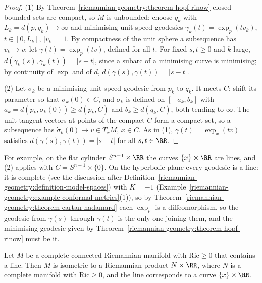 \begin{proof}
(1) By Theorem~\ref{riemannian-geometry:theorem-hopf-rinow} closed bounded sets are compact, so $M$ is unbounded: choose $q_k$ with $L_k = d(p, q_k) \to \infty$ and minimising
unit speed geodesics $\gamma_k(t) = \exp_p(tv_k)$, $t \in [0, L_k]$, $|v_k| = 1$. By compactness of the unit sphere a subsequence has $v_k \to v$; let $\gamma(t) = \exp_p(tv)$, defined for
all $t$. For fixed $s, t \geq 0$ and $k$ large, $d(\gamma_k(s), \gamma_k(t)) = |s - t|$, since a subarc of a minimising curve is minimising; by continuity of $\exp$ and of $d$,
$d(\gamma(s), \gamma(t)) = |s - t|$.

(2) Let $\sigma_k$ be a minimising unit speed geodesic from $p_k$ to $q_k$. It meets $C$; shift its parameter so that $\sigma_k(0) \in C$, and $\sigma_k$ is defined on
$[-a_k, b_k]$ with $a_k = d(p_k, \sigma_k(0)) \geq d(p_k, C)$ and $b_k \geq d(q_k, C)$, both tending to $\infty$. The unit tangent vectors at points of the compact $C$ form a compact
set, so a subsequence has $\dot\sigma_k(0) \to v \in T_xM$, $x \in C$. As in (1), $\gamma(t) = \exp_x(tv)$ satisfies $d(\gamma(s), \gamma(t)) = |s - t|$ for all $s, t \in \RR$.
\end{proof}

For example, on the flat cylinder $S^{n-1} \times \RR$ the curves $\{x\} \times \RR$ are lines, and (2) applies with $C = S^{n-1} \times \{0\}$. On the hyperbolic plane every
geodesic is a line: it is complete (see the discussion after Definition~\ref{riemannian-geometry:definition-model-spaces}) with $K = -1$
(Example~\ref{riemannian-geometry:example-conformal-metrics}(1)), so by Theorem~\ref{riemannian-geometry:theorem-cartan-hadamard} each $\exp_p$ is a diffeomorphism, so the geodesic from $\gamma(s)$ through $\gamma(t)$ is the only one joining them, and the minimising geodesic given by
Theorem~\ref{riemannian-geometry:theorem-hopf-rinow} must be it.

\begin{theorem}\label{riemannian-geometry:theorem-splitting}
Let $M$ be a complete connected Riemannian manifold with $\mathrm{Ric} \geq 0$ that contains a line. Then $M$ is isometric to a Riemannian product $N \times \RR$, where $N$ is a
complete manifold with $\mathrm{Ric} \geq 0$, and the line corresponds to a curve $\{x\} \times \RR$.
\end{theorem}

